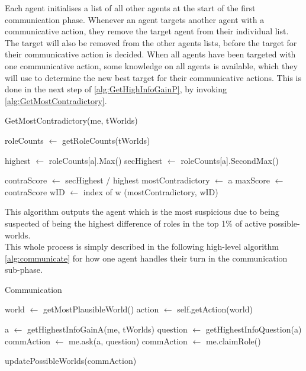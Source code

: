 \setcounter{algorithmcaption}{3}
Each agent initialises a list of all other agents at the
start of the first communication phase. Whenever an agent targets another agent
with a communicative action, they remove the target agent from their individual
list. The target will also be removed from the other agents lists, before the target for their communicative action is decided. When all agents have been targeted with one communicative action, some knowledge on all agents is available, which they will use to determine
the new best target for their communicative
actions. This is done in the next step of \cref{alg:GetHighInfoGainP},
by invoking \cref{alg:GetMostContradictory}.
\begin{algorithm}[H]
	\caption{GetMostContradictory(me, tWorlds)}
	\begin{algorithmic}
		\State roleCounts $\gets$ getRoleCounts(tWorlds)

		\State highest $\gets$ roleCounts[a].Max()
		\State secHighest $\gets$ roleCounts[a].SecondMax()

		\State contraScore $\gets$ secHighest / highest
		\State mostContradictory $\gets$ a
		\State maxScore $\gets$ contraScore
		\State wID $\gets$ index of w
		\EndIf
		\EndFor
		\EndFor
		\State \Return (mostContradictory, wID)
	\end{algorithmic}\label{alg:GetMostContradictory}
\end{algorithm}
\setcounter{algorithmcaption}{4}
This algorithm outputs the agent which is the most suspicious due to being
suspected of being the highest difference of roles in the top 1\% of active possible-worlds.\\
This whole process is simply described in the following high-level algorithm
\ref{alg:communicate} for how one agent handles their turn in the communication
sub-phase.
\begin{algorithm}[H]
	\caption{Communication}
	\begin{algorithmic}[1]
		\State world $\gets$ getMostPlausibleWorld()
		\State action $\gets$ self.getAction(world)

		\State a $\gets$ getHighestInfoGainA(me, tWorlds)
		\State question $\gets$ getHighestInfoQuestion(a)
		\State commAction $\gets$ me.ask(a, question)
		\State commAction $\gets$ me.claimRole()
		\EndIf

		\State updatePossibleWorlds(commAction)
		\EndFunction
	\end{algorithmic}\label{alg:communicate}
\end{algorithm}
